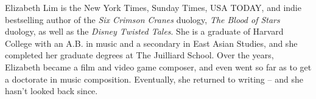 Elizabeth Lim is the New York Times, Sunday Times, USA TODAY, and indie bestselling author of the \emph{Six Crimson Cranes} duology, \emph{The Blood of Stars} duology, as well as the \emph{Disney Twisted Tales}. She is a graduate of Harvard College with an A.B. in music and a secondary in East Asian Studies, and she completed her graduate degrees at The Juilliard School. Over the years, Elizabeth became a film and video game composer, and even went so far as to get a doctorate in music composition. Eventually, she returned to writing -- and she hasn't looked back since.